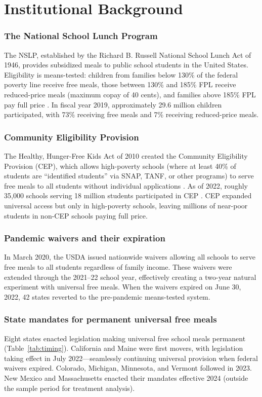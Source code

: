 \documentclass[12pt]{article}
\begin{document}
\section{Institutional Background}
\label{sec:background}

\subsubsection*{The National School Lunch Program} The NSLP, established by the Richard B. Russell National School Lunch Act of 1946, provides subsidized meals to public school students in the United States. Eligibility is means-tested: children from families below 130\% of the federal poverty line receive free meals, those between 130\% and 185\% FPL receive reduced-price meals (maximum copay of 40 cents), and families above 185\% FPL pay full price \citep{schanzenbach2009does}. In fiscal year 2019, approximately 29.6 million children participated, with 73\% receiving free meals and 7\% receiving reduced-price meals.

\subsubsection*{Community Eligibility Provision} The Healthy, Hunger-Free Kids Act of 2010 created the Community Eligibility Provision (CEP), which allows high-poverty schools (where at least 40\% of students are ``identified students'' via SNAP, TANF, or other programs) to serve free meals to all students without individual applications \citep{figlio2018universal}. As of 2022, roughly 35,000 schools serving 18 million students participated in CEP \citep{lippold2019cep}. CEP expanded universal access but only in high-poverty schools, leaving millions of near-poor students in non-CEP schools paying full price.

\subsubsection*{Pandemic waivers and their expiration} In March 2020, the USDA issued nationwide waivers allowing all schools to serve free meals to all students regardless of family income. These waivers were extended through the 2021--22 school year, effectively creating a two-year natural experiment with universal free meals. When the waivers expired on June 30, 2022, 42 states reverted to the pre-pandemic means-tested system.

\subsubsection*{State mandates for permanent universal free meals} Eight states enacted legislation making universal free school meals permanent (Table~\ref{tab:timing}). California and Maine were first movers, with legislation taking effect in July 2022---seamlessly continuing universal provision when federal waivers expired. Colorado, Michigan, Minnesota, and Vermont followed in 2023. New Mexico and Massachusetts enacted their mandates effective 2024 (outside the sample period for treatment analysis).
\end{document}
